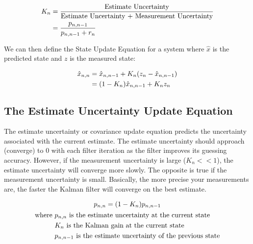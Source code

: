 \begin{equation} \labeq{kalman_gain}
    \begin{aligned}
        K_n &= \frac{\text{Estimate Uncertainty}}{\text{Estimate Uncertainty + Measurement Uncertainty}} \\
            &= \frac{p_{n,n-1}}{p_{n,n-1} + r_n}
    \end{aligned}
\end{equation}

We can then define the State Update Equation for a system where $\hat{x}$ is the predicted state and $z$ is the measured state:

\begin{equation} \labeq{kalman_state_update}
    \begin{aligned}
        \hat{x}_{n,n} &= \hat{x}_{n,n-1} + K_n(z_n - \hat{x}_{n,n-1}) \\
                        &= (1-K_n)\hat{x}_{n,n-1} + K_n z_n \\
    \end{aligned}
\end{equation}

\subsection{The Estimate Uncertainty Update Equation} 
The estimate uncertainty or covariance update equation predicts the uncertainty associated with the current estimate.
The estimate uncertainty should approach (converge) to 0 with each filter iteration as the filter improves its guessing accuracy.
However, if the measurement uncertainty is large ($K_n << 1$), the estimate uncertainty will converge more slowly.
The opposite is true if the measurement uncertainty is small.
Basically, the more precise your measurements are, the faster the Kalman filter will converge on the best estimate.

\begin{gather}
    p_{n,n} = (1-K_n)p_{n,n-1} \\
    \begin{aligned}
        \text{where } &p_{n,n} \text{ is the estimate uncertainty at the current state} \\
                        &K_n \text{ is the Kalman gain at the current state} \\
                        &p_{n,n-1} \text{ is the estimate uncertainty of the previous state}
    \end{aligned} \notag
\end{gather}


